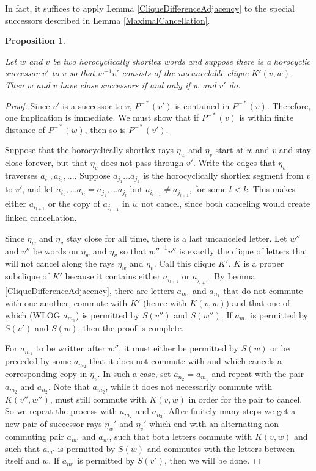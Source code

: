 \documentclass[10pt,a4paper]{amsart}
\newtheorem{proposition}[theorem]{Proposition}
\theoremstyle{definition}
\theoremstyle{remark}
\begin{document}
	In fact, it suffices to apply Lemma \ref{CliqueDifferenceAdjacency} to the special successors described in Lemma \ref{MaximalCancellation}.
	
	\begin{proposition}\label{DivergenceEdgeCriterion}
		
		Let $w$ and $v$ be two horocyclically shortlex words and suppose there is a horocyclic successor $v'$ to $v$ so that $w^{-1}v'$ consists of the uncancelable clique $K'(v,w)$. Then $w$ and $v$ have close successors if and only if $w$ and $v'$ do.
		
	\end{proposition}
	
	\begin{proof}
		
		Since $v'$ is a successor to $v$, $P^{-*}(v')$ is contained in $P^{-*}(v)$.  Therefore, one implication is immediate. We must show that if $P^{-*}(v)$ is within finite distance of $P^{-*}(w)$, then so is $P^{-*}(v')$.
		
		Suppose that the horocyclically shortlex rays $\eta_w$ and $\eta_v$ start at $w$ and $v$ and stay close forever, but that $\eta_v$ does not pass through $v'$. Write the edges that $\eta_v$ traverses $a_{i_1},a_{i_2},...$. Suppose $a_{j_1}...a_{j_k}$ is the horocyclically shortlex segment from $v$ to $v'$, and let $a_{i_1}, ... a_{i_l}=a_{j_1}, ... a_{j_l}$ but $a_{i_{l+1}}\ne a_{j_{l+1}}$, for some $l<k$. This makes either $a_{i_{l+1}}$ or the copy of $a_{j_{l+1}}$ in $w$ not cancel, since both canceling would create linked cancellation.
		
		Since $\eta_w$ and $\eta_v$ stay close for all time, there is a last uncanceled letter. Let $w''$ and $v''$ be words on $\eta_w$ and $\eta_v$ so that $w''^{-1}v''$ is exactly the clique of letters that will not cancel along the rays $\eta_w$ and $\eta_v$. Call this clique $K'$. $K$ is a proper subclique of $K'$ because it contains either $a_{i_{l+1}}$ or $a_{j_{l+1}}$. By Lemma \ref{CliqueDifferenceAdjacency}, there are letters $a_{m_1}$ and $a_{n_1}$ that do not commute with one another, commute with $K'$ (hence with $K(v,w)$) and that one of which (WLOG $a_{m_1}$) is permitted by $S(v'')$ and $S(w'')$. If $a_{m_1}$ is permitted by $S(v')$ and $S(w)$, then the proof is complete.
		
		For $a_{m_1}$ to be written after $w''$, it must either be permitted by $S(w)$ or be preceded by some $a_{m_2}$ that it does not commute with and which cancels a corresponding copy in $\eta_v$. In such a case, set $a_{n_2}=a_{m_1}$ and repeat with the pair $a_{m_2}$ and $a_{n_2}$. Note that $a_{m_2}$, while it does not necessarily commute with $K(v'',w'')$, must still commute with $K(v,w)$ in order for the pair to cancel. So we repeat the process with $a_{m_2}$ and $a_{n_2}$. After finitely many steps we get a new pair of successor rays $\eta_w'$ and $\eta_v'$ which end with an alternating non-commuting pair $a_{m'}$ and $a_{n'}$, such that both letters commute with $K(v,w)$ and such that $a_{m'}$ is permitted by $S(w)$ and commutes with the letters between itself and $w$. If $a_{m'}$ is permitted by $S(v')$, then we will be done.
		

\end{proof}
\end{document}
